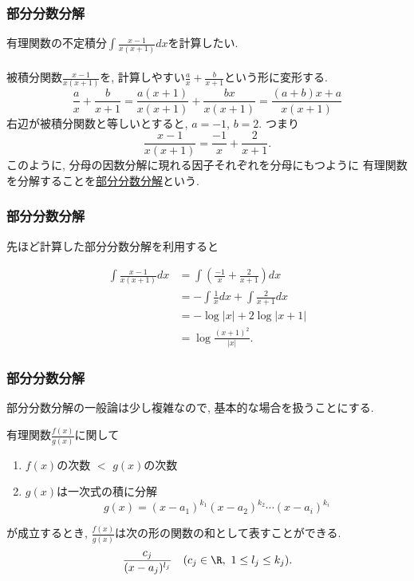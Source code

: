 \begin{frame}
\frametitle{部分分数分解}

有理関数の不定積分$\int \frac{x-1}{x(x+1)}dx$を計算したい. \\
\ \\

被積分関数$\frac{x-1}{x(x+1)}$を, 計算しやすい$\frac{a}{x}+\frac{b}{x+1}$という形に変形する. 
$$
\frac{a}{x}+\frac{b}{x+1}=
\frac{a(x+1)}{x(x+1)}+\frac{bx}{x(x+1)}=
\frac{(a+b)x+a}{x(x+1)}
$$
右辺が被積分関数と等しいとすると, $a=-1$, $b=2$. 
つまり
$$
\frac{x-1}{x(x+1)} = \frac{-1}{x}+\frac{2}{x+1}. 
$$
このように, 分母の因数分解に現れる因子それぞれを分母にもつように
有理関数を分解することを\underline{部分分数分解}という. 
\end{frame}





\begin{frame}
\frametitle{部分分数分解}

先ほど計算した部分分数分解を利用すると

\begin{align*}
\int \frac{x-1}{x(x+1)}dx & = \int ( \frac{-1}{x}+\frac{2}{x+1})dx \\
& = -\int \frac{1}{x}dx + \int \frac{2}{x+1} dx \\
& = -\log|x| + 2 \log |x+1| \\
& = \log \frac{(x+1)^2}{|x|}.  
\end{align*}

\end{frame}







\begin{frame}
\frametitle{部分分数分解}

部分分数分解の一般論は少し複雑なので, 基本的な場合を扱うことにする. 

\begin{Thm} \label{部分分数分解定理}
有理関数$\frac{f(x)}{g(x)}$に関して
\begin{enumerate}
\item $f(x)$の次数 $<$  $g(x)$の次数
\item $g(x)$は一次式の積に分解
$$
g(x)=(x-a_1)^{k_1}(x-a_2)^{k_2} \cdots (x-a_i)^{k_i}
$$
\end{enumerate}
が成立するとき, 
$\frac{f(x)}{g(x)}$は次の形の関数の和として表すことができる. 
$$
\frac{c_j}{(x-a_j)^{l_j}} \ \ \ (c_j \in \R, \ 1 \le l_j \le k_j). 
$$
\end{Thm}

\end{frame}



